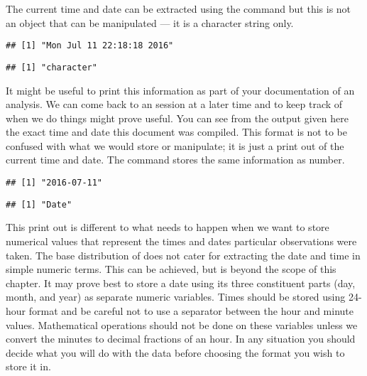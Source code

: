 The current time and date can be extracted using the  command but this is not an object that can be manipulated --- it is a character string only. 
\begin{knitrout}
\color{fgcolor}\begin{kframe}
\begin{alltt}
\hlstd{()}
\end{alltt}
\begin{verbatim}
## [1] "Mon Jul 11 22:18:18 2016"
\end{verbatim}
\begin{alltt}
\hlstd{(}\hlstd{())}
\end{alltt}
\begin{verbatim}
## [1] "character"
\end{verbatim}
\end{kframe}
\end{knitrout}
It might be useful to print this information as part of your documentation of an analysis. We can come back to an \R{} session at a later time and to keep track of when we do things might prove useful. You can see from the output given here the exact time and date this document was compiled. This format is not to be confused with what we would store or manipulate; it is just a print out of the current time and date. The  command stores the same information as number. 
\begin{knitrout}
\color{fgcolor}\begin{kframe}
\begin{alltt}
\hlstd{()}
\end{alltt}
\begin{verbatim}
## [1] "2016-07-11"
\end{verbatim}
\begin{alltt}
\hlstd{(}\hlstd{())}
\end{alltt}
\begin{verbatim}
## [1] "Date"
\end{verbatim}
\end{kframe}
\end{knitrout}
 
This print out is different to what needs to happen when we want to store numerical values that represent the times and dates particular observations were taken. The base distribution of \R{} does not cater for extracting the date and time in simple numeric terms. This can be achieved, but is beyond the scope of this chapter. It may prove best to store a date using its three constituent parts (day, month, and year) as separate numeric variables. Times should be stored using 24-hour format and be careful not to use a separator between the hour and minute values. Mathematical operations should not be done on these variables unless we convert the minutes to decimal fractions of an hour. In any situation you should decide what you will do with the data before choosing the format you wish to store it in. 
 
